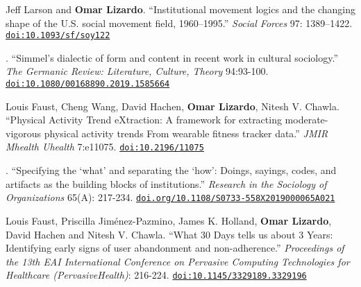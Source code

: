 
\ind Jeff Larson and {\bf Omar Lizardo}.  ``Institutional movement logics and the changing shape of the U.S. social movement field, 1960–1995.'' {\em Social Forces} 97: 1389–1422. \href{https://doi.org/10.1093/sf/soy122}{\nolinkurl{doi:10.1093/sf/soy122}}

. ``Simmel's dialectic of form and content in recent work in cultural sociology.'' {\em The Germanic Review: Literature, Culture, Theory} 94:93-100. \href{https://doi.org/10.1080/00168890.2019.1585664}{\nolinkurl{doi:10.1080/00168890.2019.1585664}}

\ind Louis Faust, Cheng Wang, David Hachen, {\bf Omar Lizardo}, Nitesh V. Chawla. ``Physical Activity Trend eXtraction: A framework for extracting moderate-vigorous physical activity trends From wearable fitness tracker data.'' {\em JMIR Mhealth Uhealth} 7:e11075. \href{https://doi.org/10.2196/11075}{\nolinkurl{doi:10.2196/11075}}

. ``Specifying the `what' and separating the `how': Doings, sayings, codes, and artifacts as the building blocks of institutions.'' {\em Research in the Sociology of Organizations} 65(A): 217-234. \newline \href{https://doi.org/10.1108/S0733-558X2019000065A021}{\nolinkurl{doi.org/10.1108/S0733-558X2019000065A021}}

\ind Louis Faust, Priscilla Jim\'{e}nez-Pazmino, James K. Holland, {\bf Omar Lizardo}, David Hachen and Nitesh V. Chawla. ``What 30 Days tells us about 3 Years: Identifying early signs of user abandonment and non-adherence.'' {\em Proceedings of the 13th EAI International Conference on Pervasive Computing Technologies for Healthcare (PervasiveHealth)}: 216-224. \href{https://doi.org/10.1145/3329189.3329196}{\nolinkurl{doi:10.1145/3329189.3329196}}
